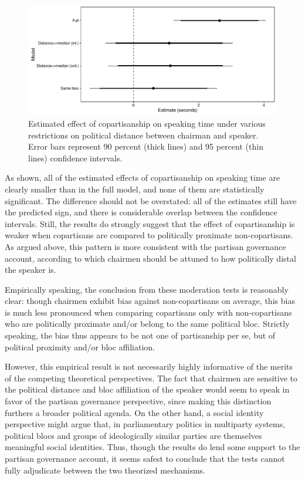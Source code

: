 \documentclass[12pt,a4paper]{article}
\begin{document}


\begin{figure}[!htbp]
\centering
\includegraphics[scale=.65]{../figures/parlbias_modeffectplot}
  \caption{Estimated effect of copartisanship on speaking time under various restrictions on political distance between chairman and speaker. Error bars represent 90 percent (thick lines) and 95 percent (thin lines) confidence intervals.}\label{parlbias_modeffectplot}
\end{figure}


As shown, all of the estimated effects of copartisanship on speaking time are clearly smaller than in the full model, and none of them are statistically significant. The difference should not be overstated: all of the estimates still have the predicted sign, and there is considerable overlap between the confidence intervals. Still, the results do strongly suggest that the effect of copartisanship is weaker when copartisans are compared to politically proximate non-copartisans. As argued above, this pattern is more consistent with the partisan governance account, according to which chairmen should be attuned to how politically distal the speaker is.

Empirically speaking, the conclusion from these moderation tests is reasonably clear: though chairmen exhibit bias against non-copartisans on average, this bias is much less pronounced when comparing copartisans only with non-copartisans who are politically proximate and/or belong to the same political bloc. Strictly speaking, the bias thus appears to be not one of partisanship per se, but of political proximity and/or bloc affiliation.

However, this empirical result is not necessarily highly informative of the merits of the competing theoretical perspectives. The fact that chairmen are sensitive to the political distance and bloc affiliation of the speaker would seem to speak in favor of the partisan governance perspective, since making this distinction furthers a broader political agenda. On the other hand, a social identity perspective might argue that, in parliamentary politics in multiparty systems, political blocs and groups of ideologically similar parties are themselves meaningful social identities. Thus, though the results do lend some support to the partisan governance account, it seems safest to conclude that the tests cannot fully adjudicate between the two theorized mechanisms.
\end{document}
